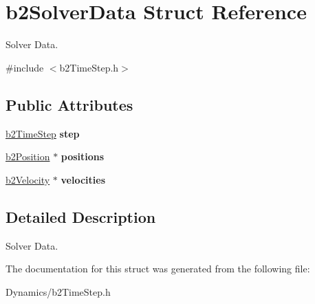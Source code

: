 \hypertarget{structb2SolverData}{}\section{b2\+Solver\+Data Struct Reference}
\label{structb2SolverData}


Solver Data.  




{\ttfamily \#include $<$b2\+Time\+Step.\+h$>$}

\subsection*{Public Attributes}
\begin{DoxyCompactItemize}
\item 
\mbox{\label{structb2SolverData_a99998296de1b4f128c396def56392eea}} 
\mbox{\hyperlink{structb2TimeStep}{b2\+Time\+Step}} {\bfseries step}
\item 
\mbox{\label{structb2SolverData_a5eb6ee68b42d96164579a4a0df8be04b}} 
\mbox{\hyperlink{structb2Position}{b2\+Position}} $\ast$ {\bfseries positions}
\item 
\mbox{\label{structb2SolverData_a1072627a3e962a8bc7088657a512191c}} 
\mbox{\hyperlink{structb2Velocity}{b2\+Velocity}} $\ast$ {\bfseries velocities}
\end{DoxyCompactItemize}


\subsection{Detailed Description}
Solver Data. 

The documentation for this struct was generated from the following file\+:\begin{DoxyCompactItemize}
\item 
Dynamics/b2\+Time\+Step.\+h\end{DoxyCompactItemize}
